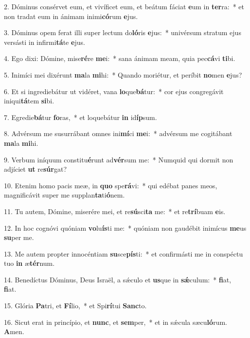 2. Dóminus consérvet eum, et vivíficet eum, et beátum fáciat \textbf{e}um in \textbf{ter}ra:~*  et non tradat eum in ánimam inimi\textbf{có}rum \textbf{e}jus.\

3. Dóminus opem ferat illi super lectum do\textbf{ló}ris \textbf{e}jus:~*  univérsum stratum ejus versásti in infirmi\textbf{tá}te \textbf{e}jus.\

4. Ego dixi: Dómine, mise\textbf{ré}re \textbf{me}i:~*  sana ánimam meam, quia pec\textbf{cá}vi \textbf{ti}bi.\

5. Inimíci mei dixérunt \textbf{ma}la \textbf{mi}hi:~*  Quando moriétur, et períbit \textbf{no}men \textbf{e}jus?\

6. Et si ingrediebátur ut vidéret, vana \textbf{lo}que\textbf{bá}tur:~*  cor ejus congregávit iniqui\textbf{tá}tem \textbf{si}bi.\

7. Egredie\textbf{bá}tur \textbf{fo}ras,~*  et loquebátur \textbf{in} id\textbf{íp}sum.\

8. Advérsum me susurrábant omnes ini\textbf{mí}ci \textbf{me}i:~*  advérsum me cogitábant \textbf{ma}la \textbf{mi}hi.\

9. Verbum iníquum constitu\textbf{é}runt ad\textbf{vér}sum me:~*  Numquid qui dormit non adjíciet \textbf{ut} re\textbf{súr}gat?\

10. Etenim homo pacis meæ, in \textbf{quo} spe\textbf{rá}vi:~*  qui edébat panes meos, magnificávit super me supplan\textbf{ta}ti\textbf{ó}nem.\

11. Tu autem, Dómine, miserére mei, et re\textbf{sú}sci\textbf{ta} me:~*  et re\textbf{trí}buam \textbf{e}is.\

12. In hoc cognóvi quóniam \textbf{vo}lu\textbf{ís}ti me:~*  quóniam non gaudébit inimícus \textbf{me}us \textbf{su}per me.\

13. Me autem propter innocéntiam \textbf{su}sce\textbf{pís}ti:~*  et confirmásti me in conspéctu tuo \textbf{in} æ\textbf{tér}num.\

14. Benedíctus Dóminus, Deus Israël, a sǽculo et \textbf{us}que in \textbf{sǽ}culum:~*  \textbf{fi}at, \textbf{fi}at.\

15. Glória \textbf{Pa}tri, et \textbf{Fí}lio,~*  et Spi\textbf{rí}tui \textbf{Sanc}to.\

16. Sicut erat in princípio, et \textbf{nunc}, et \textbf{sem}per,~*  et in sǽcula sæcu\textbf{ló}rum. \textbf{A}men.\

